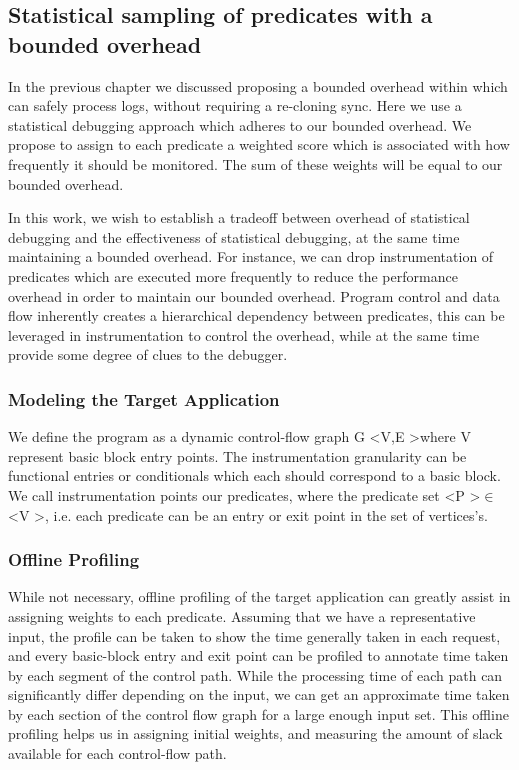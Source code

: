\subsection{Statistical sampling of predicates with a bounded overhead}
\label{sec:guided_model}

In the previous chapter we discussed proposing a bounded overhead within which \parikshan can safely process logs, without requiring a re-cloning sync.
Here we use a statistical debugging approach which adheres to our bounded overhead.
We propose to assign to each predicate a weighted score which is associated with how frequently it should be monitored.
The sum of these weights will be equal to our bounded overhead.

In this work, we wish to establish a tradeoff between overhead of statistical debugging and the effectiveness of statistical debugging, at the same time maintaining a bounded overhead.
For instance, we can drop instrumentation of predicates which are executed more frequently to reduce the performance overhead in order to maintain our bounded overhead.
Program control and data flow inherently creates a hierarchical dependency between predicates, this can be leveraged in instrumentation to control the overhead, while at the same time provide some degree of clues to the debugger.

\subsubsection{Modeling the Target Application}

We define the program as a dynamic control-flow graph G \textless V,E \textgreater where V represent basic block entry points. 
The instrumentation granularity can be functional entries or conditionals which each should correspond to a basic block.
We call instrumentation points our predicates, where the predicate set \textless P \textgreater $\in$ \textless V \textgreater, 
i.e. each predicate can be an entry or exit point in the set of vertices's.


\subsubsection{Offline Profiling}

While not necessary, offline profiling of the target application can greatly assist in assigning weights to each predicate. 
Assuming that we have a representative input, the profile can be taken to show the time generally taken in each request, 
and every basic-block entry and exit point can be profiled to annotate time taken by each segment of the control path. 
While the processing time of each path can significantly differ depending on the input, 
we can get an approximate time taken by each section of the control flow graph for a large enough input set. 
This offline profiling helps us in assigning initial weights, and measuring the amount of slack available for each control-flow path.

